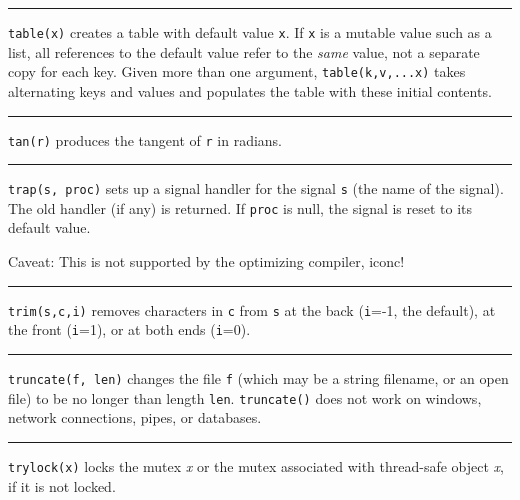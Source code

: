 \bigskip\hrule\vspace{0.1cm}

\noindent
{}\texttt{table(x)} creates a table with default value
\texttt{x}. If \texttt{x} is a mutable value such as a list, all
references to the default value refer to the \textit{same} value, not a
separate copy for each key. Given more than one argument,
\texttt{table(k,v,...x)} takes alternating keys and values and
populates the table with these initial contents.

\bigskip\hrule\vspace{0.1cm}

\noindent
{}\texttt{tan(r)} produces the tangent of \texttt{r} in
radians.

\bigskip\hrule\vspace{0.1cm}

\noindent
{}\texttt{trap(s, proc)} sets up a signal handler for
the signal \texttt{s} (the name of the signal). The old handler (if
any) is returned. If \texttt{proc} is null, the signal is reset to its
default value. 

Caveat: This is not supported by the optimizing
compiler, iconc!

\bigskip\hrule\vspace{0.1cm}

\noindent
{}\texttt{trim(s,c,i)} removes characters in \texttt{c}
from \texttt{s} at the back (\texttt{i}=-1, the default), at the front
(\texttt{i}=1), or at both ends (\texttt{i}=0).

\bigskip\hrule\vspace{0.1cm}

\noindent
{}\texttt{truncate(f, len)} changes the file
\texttt{f} (which may be a string filename, or an open file) to be no
longer than length \texttt{len}. \texttt{truncate()} does not work on
windows, network connections, pipes, or databases.

\bigskip\hrule\vspace{0.1cm}

\noindent
{}\texttt{trylock(x)} locks the mutex {\textit x} or the mutex
associated with thread-safe object {\textit x}, if it is not locked.

